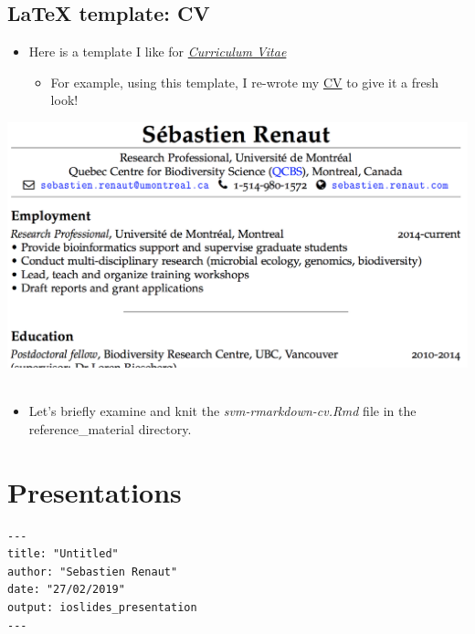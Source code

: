 \documentclass[]{article}
\providecommand{\tightlist}{%
  \setlength{\itemsep}{0pt}\setlength{\parskip}{0pt}}
\begin{document}
\hypertarget{latex-template-cv}{%
\subsection{LaTeX template: CV}\label{latex-template-cv}}

\begin{itemize}
\item
  Here is a template I like for
  \href{https://github.com/svmiller/svm-r-markdown-templates/blob/master/svm-latex-cv.tex}{\emph{Curriculum
  Vitae}}

  \begin{itemize}
  \tightlist
  \item
    For example, using this template, I re-wrote my
    \href{http://sebastien.renaut.com/wp-content/uploads/2019/02/cv.pdf}{CV}
    to give it a fresh look!\\
    \hspace*{0.333em}
  \end{itemize}
\end{itemize}

\includegraphics[width=6.25in,height=\textheight]{../figures/CV.png} ~

\begin{itemize}
\tightlist
\item
  Let's briefly examine and knit the \emph{svm-rmarkdown-cv.Rmd} file in
  the reference\_material directory.
\end{itemize}

\hypertarget{presentations}{%
\section{Presentations}\label{presentations}}

\begin{verbatim}
---
title: "Untitled"
author: "Sebastien Renaut"
date: "27/02/2019"
output: ioslides_presentation
---
\end{verbatim}
\end{document}

